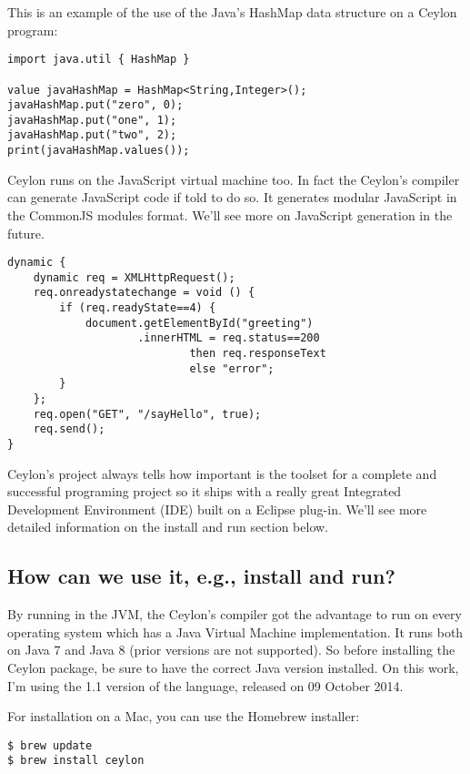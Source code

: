 This is an example of the use of the Java's HashMap data structure on a Ceylon
program:

\begin{lstlisting}[label=cujhm,caption=Ceylon using Java HashMap]
import java.util { HashMap }

value javaHashMap = HashMap<String,Integer>();
javaHashMap.put("zero", 0);
javaHashMap.put("one", 1);
javaHashMap.put("two", 2);
print(javaHashMap.values());
\end{lstlisting}

Ceylon runs on the JavaScript virtual machine too. In fact the Ceylon's compiler
can generate JavaScript code if told to do so. It generates modular JavaScript
in the CommonJS modules format. We'll see more on JavaScript generation in the
future.

\begin{lstlisting}[label=cjs,caption=Ceylon JavaScript]
dynamic {
    dynamic req = XMLHttpRequest();
    req.onreadystatechange = void () {
        if (req.readyState==4) {
            document.getElementById("greeting")
                    .innerHTML = req.status==200
                            then req.responseText
                            else "error";
        }
    };
    req.open("GET", "/sayHello", true);
    req.send();
}
\end{lstlisting}

Ceylon's project always tells how important is the toolset for a complete and
successful programing project so it ships with a really great Integrated
Development Environment (IDE) built on a Eclipse plug-in. We'll see more
detailed information on the {install and run} section below.

\subsection{How can we use it, e.g., install and run?}

By running in the JVM, the Ceylon's compiler got the advantage to run
on every operating system which has a Java Virtual Machine implementation. It  
runs both on Java 7 and Java 8 (prior versions are not supported). So before
installing the Ceylon package, be sure to have the correct Java version
installed. On this work, I'm using the 1.1 version of the language, released on
09 October 2014.

For installation on a Mac, you can use the Homebrew installer:

\begin{verbatim}
$ brew update
$ brew install ceylon
\end{verbatim}

